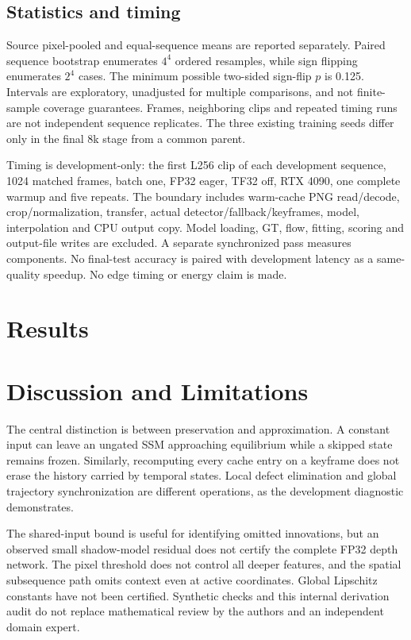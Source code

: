\documentclass[mathematics,article,submit,moreauthors]{Definitions/mdpi}
\begin{document}
\subsection{Statistics and timing}
Source pixel-pooled and equal-sequence means are reported separately. Paired sequence
bootstrap enumerates $4^4$ ordered resamples, while sign flipping enumerates $2^4$ cases.
The minimum possible two-sided sign-flip $p$ is 0.125. Intervals are exploratory,
unadjusted for multiple comparisons, and not finite-sample coverage guarantees.
Frames, neighboring clips and repeated timing runs are not independent sequence replicates.
The three existing training seeds differ only in the final 8k stage from a common parent.

Timing is development-only: the first L256 clip of each development sequence, 1024 matched
frames, batch one, FP32 eager, TF32 off, RTX 4090, one complete warmup and five repeats.
The boundary includes warm-cache PNG read/decode, crop/normalization, transfer, actual
detector/fallback/keyframes, model, interpolation and CPU output copy. Model loading,
GT, flow, fitting, scoring and output-file writes are excluded. A separate synchronized
pass measures components. No final-test accuracy is paired with development latency
as a same-quality speedup. No edge timing or energy claim is made.

\section{Results}




\section{Discussion and Limitations}
The central distinction is between preservation and approximation. A constant input can
leave an ungated SSM approaching equilibrium while a skipped state remains frozen.
Similarly, recomputing every cache entry on a keyframe does not erase the history carried
by temporal states. Local defect elimination and global trajectory synchronization
are different operations, as the development diagnostic demonstrates.

The shared-input bound is useful for identifying omitted innovations, but an observed
small shadow-model residual does not certify the complete FP32 depth network. The
pixel threshold does not control all deeper features, and the spatial subsequence path
omits context even at active coordinates. Global Lipschitz constants have not been
certified. Synthetic checks and this internal derivation audit do not replace mathematical
review by the authors and an independent domain expert.
\end{document}
